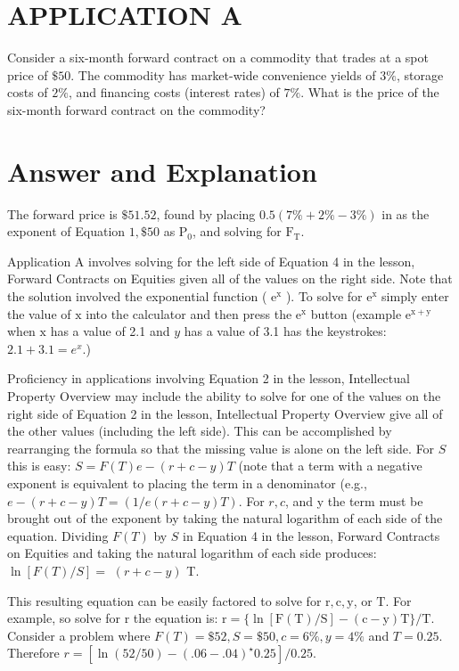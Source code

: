 \documentclass[11pt]{article}
\begin{document}
\section*{APPLICATION A}
Consider a six-month forward contract on a commodity that trades at a spot price of $\$ 50$. The commodity has market-wide convenience yields of $3 \%$, storage costs of $2 \%$, and financing costs (interest rates) of $7 \%$. What is the price of the six-month forward contract on the commodity?

\section*{Answer and Explanation}
The forward price is $\$ 51.52$, found by placing $0.5(7 \%+2 \%-3 \%)$ in as the exponent of Equation $1, \$ 50$ as $\mathrm{P}_{0}$, and solving for $\mathrm{F}_{\mathrm{T}}$.

Application A involves solving for the left side of Equation 4 in the lesson, Forward Contracts on Equities given all of the values on the right side. Note that the solution involved the exponential function ( $\mathrm{e}^{\mathrm{x}}$ ). To solve for $\mathrm{e}^{\mathrm{x}}$ simply enter the value of $\mathrm{x}$ into the calculator and then press the $\mathrm{e}^{\mathrm{x}}$ button (example $\mathrm{e}^{\mathrm{x}+\mathrm{y}}$ when $\mathrm{x}$ has a value of 2.1 and $y$ has a value of 3.1 has the keystrokes: $2.1+3.1=e^{x}$.)

Proficiency in applications involving Equation 2 in the lesson, Intellectual Property Overview may include the ability to solve for one of the values on the right side of Equation 2 in the lesson, Intellectual Property Overview give all of the other values (including the left side). This can be accomplished by rearranging the formula so that the missing value is alone on the left side. For $S$ this is easy: $S=F(T) e-(r+c-y) T$ (note that a term with a negative exponent is equivalent to placing the term in a denominator (e.g., $e-(r+c-y) T=(1 / e(r+c-y) T)$. For $r, c$, and y the term must be brought out of the exponent by taking the natural logarithm of each side of the equation. Dividing $F(T)$ by $S$ in Equation 4 in the lesson, Forward Contracts on Equities and taking the natural logarithm of each side produces: $\ln [F(T) / S]=$ $(r+c-y)$ T.

This resulting equation can be easily factored to solve for $\mathrm{r}, \mathrm{c}, \mathrm{y}$, or $\mathrm{T}$. For example, so solve for $\mathrm{r}$ the equation is: $\mathrm{r}=\{\ln [\mathrm{F}(\mathrm{T}) / \mathrm{S}]-(\mathrm{c}-\mathrm{y}) \mathrm{T}\} / \mathrm{T}$. Consider a problem where $F(T)=\$ 52, S=\$ 50, c=6 \%, y=4 \%$ and $T=0.25$. Therefore $r=\left[\ln (52 / 50)-(.06-.04)^{\star} 0.25\right] / 0.25$.
\end{document}
